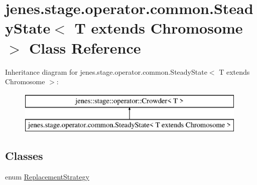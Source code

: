 \hypertarget{classjenes_1_1stage_1_1operator_1_1common_1_1_steady_state_3_01_t_01extends_01_chromosome_01_4}{\section{jenes.\-stage.\-operator.\-common.\-Steady\-State$<$ T extends Chromosome $>$ Class Reference}
\label{classjenes_1_1stage_1_1operator_1_1common_1_1_steady_state_3_01_t_01extends_01_chromosome_01_4}
}
Inheritance diagram for jenes.\-stage.\-operator.\-common.\-Steady\-State$<$ T extends Chromosome $>$\-:\begin{figure}[H]
\begin{center}
\leavevmode
\includegraphics[height=2.000000cm]{classjenes_1_1stage_1_1operator_1_1common_1_1_steady_state_3_01_t_01extends_01_chromosome_01_4}
\end{center}
\end{figure}
\subsection*{Classes}
\begin{DoxyCompactItemize}
\item 
enum \hyperlink{enumjenes_1_1stage_1_1operator_1_1common_1_1_steady_state_3_01_t_01extends_01_chromosome_01_4_1_1_replacement_strategy}{Replacement\-Strategy}
\end{DoxyCompactItemize}
